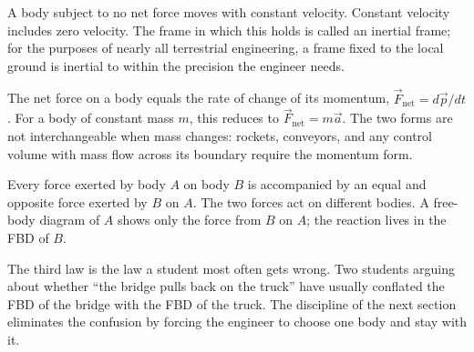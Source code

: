 \begin{principle}
A body subject to no net force moves with constant velocity. Constant
velocity includes zero velocity. The frame in which this holds is
called an inertial frame; for the purposes of nearly all terrestrial
engineering, a frame fixed to the local ground is inertial to within
the precision the engineer needs.
\end{principle}

\begin{principle}
The net force on a body equals the rate of change of its momentum,
$\vec{F}_{\text{net}} = d\vec{p}/dt$. For a body of constant mass $m$,
this reduces to $\vec{F}_{\text{net}} = m\vec{a}$. The two forms are
not interchangeable when mass changes: rockets, conveyors, and any
control volume with mass flow across its boundary require the momentum
form.
\end{principle}

\begin{principle}
Every force exerted by body $A$ on body $B$ is accompanied by an equal
and opposite force exerted by $B$ on $A$. The two forces act on
different bodies. A free-body diagram of $A$ shows only the force from
$B$ on $A$; the reaction lives in the FBD of $B$.
\end{principle}

The third law is the law a student most often gets wrong. Two students
arguing about whether ``the bridge pulls back on the truck'' have
usually conflated the FBD of the bridge with the FBD of the truck. The
discipline of the next section eliminates the confusion by forcing the
engineer to choose one body and stay with it.

